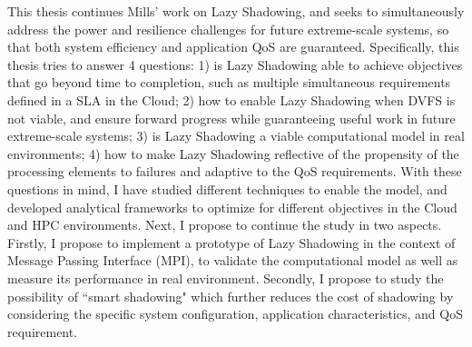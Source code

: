 
This thesis continues Mills' work on Lazy Shadowing, and seeks to simultaneously address the power and resilience challenges for future extreme-scale systems, so that both system efficiency and application QoS are guaranteed.
Specifically, this thesis tries to answer 4 questions: 1) is Lazy Shadowing able to achieve objectives that go beyond time to completion, such as multiple simultaneous requirements defined in a SLA in the Cloud; 2) how to enable Lazy Shadowing when DVFS is not viable, and ensure forward progress while guaranteeing useful work in future extreme-scale systems; 3) is Lazy Shadowing a viable computational model in real environments; 4) how to make Lazy Shadowing reflective of the propensity of the processing elements to failures and adaptive to the QoS requirements.
With these questions in mind, 
I have studied different techniques to enable the model, and developed analytical frameworks to optimize for different objectives in the Cloud and HPC environments.
Next, I propose to continue the study in two aspects.
Firstly, I propose to implement a prototype of Lazy Shadowing in the context of Message Passing Interface (MPI), to validate the 
computational model as well as measure its performance in real environment. Secondly, I propose to study the possibility of 
``smart shadowing" which further reduces the cost of shadowing by considering the specific system configuration, application characteristics, and QoS requirement.

